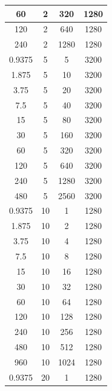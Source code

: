 \documentclass[a4paper, 12pt]{article}
\begin{document}
\begin{longtable}[c]{|c|c|c|c|}
60         & 2               & 320            & 1280    \\ \hline
120        & 2               & 640            & 1280    \\ \hline
240        & 2               & 1280           & 1280    \\ \hline
0.9375     & 5               & 5              & 3200    \\ \hline
1.875      & 5               & 10             & 3200    \\ \hline
3.75       & 5               & 20             & 3200    \\ \hline
7.5        & 5               & 40             & 3200    \\ \hline
15         & 5               & 80             & 3200    \\ \hline
30         & 5               & 160            & 3200    \\ \hline
60         & 5               & 320            & 3200    \\ \hline
120        & 5               & 640            & 3200    \\ \hline
240        & 5               & 1280           & 3200    \\ \hline
480        & 5               & 2560           & 3200    \\ \hline
0.9375     & 10              & 1              & 1280    \\ \hline
1.875      & 10              & 2              & 1280    \\ \hline
3.75       & 10              & 4              & 1280    \\ \hline
7.5        & 10              & 8              & 1280    \\ \hline
15         & 10              & 16             & 1280    \\ \hline
30         & 10              & 32             & 1280    \\ \hline
60         & 10              & 64             & 1280    \\ \hline
120        & 10              & 128            & 1280    \\ \hline
240        & 10              & 256            & 1280    \\ \hline
480        & 10              & 512            & 1280    \\ \hline
960        & 10              & 1024           & 1280    \\ \hline
0.9375     & 20              & 1              & 1280    \\ \hline

\end{longtable}
\end{document}
